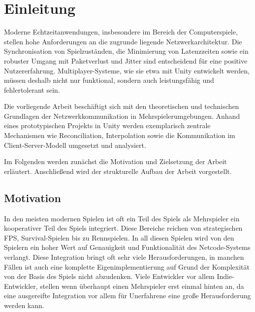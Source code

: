 \chapter{Einleitung}
\label{chapter_1}
\newcommand{\keyword}[1]{\textbf{#1}}
\newcommand{\tabhead}[1]{\textbf{#1}}
\newcommand{\code}[1]{\texttt{#1}}
\newcommand{\file}[1]{\texttt{\bfseries#1}}
\newcommand{\option}[1]{\texttt{\itshape#1}}

Moderne Echtzeitanwendungen, insbesondere im Bereich der Computerspiele, stellen hohe Anforderungen an die zugrunde liegende Netzwerkarchitektur. Die Synchronisation von Spielzuständen, die Minimierung von Latenzzeiten sowie ein robuster Umgang mit Paketverlust und Jitter sind entscheidend für eine positive Nutzererfahrung. Multiplayer-Systeme, wie sie etwa mit Unity entwickelt werden, müssen deshalb nicht nur funktional, sondern auch leistungsfähig und fehlertolerant sein.

Die vorliegende Arbeit beschäftigt sich mit den theoretischen und technischen Grundlagen der Netzwerkkommunikation in Mehrspielerumgebungen. Anhand eines prototypischen Projekts in Unity werden exemplarisch zentrale Mechanismen wie Reconciliation, Interpolation sowie die Kommunikation im Client-Server-Modell umgesetzt und analysiert.

Im Folgenden werden zunächst die Motivation und Zielsetzung der Arbeit erläutert. Anschließend wird der strukturelle Aufbau der Arbeit vorgestellt.

\section{Motivation}
In den meisten modernen Spielen ist oft ein Teil des Spiels als Mehrspieler ein kooperativer Teil des Spiels integriert. Diese Bereiche reichen von strategischen FPS, Survival-Spielen bis zu Rennspielen. In all diesen Spielen wird von den Spielern ein hoher Wert auf Genauigkeit und Funktionalität des Netcode-Systems verlangt.
Diese Integration bringt oft sehr viele Herausforderungen, in manchen Fällen ist auch eine komplette Eigenimplementierung auf Grund der Komplexität von der Basis des Spiels nicht abzudenken. Viele Entwickler vor allem Indie-Entwickler, stellen wenn überhaupt einen Mehrspieler erst einmal hinten an, da eine ausgereifte Integration vor allem für Unerfahrene eine große Herausforderung werden kann. 

